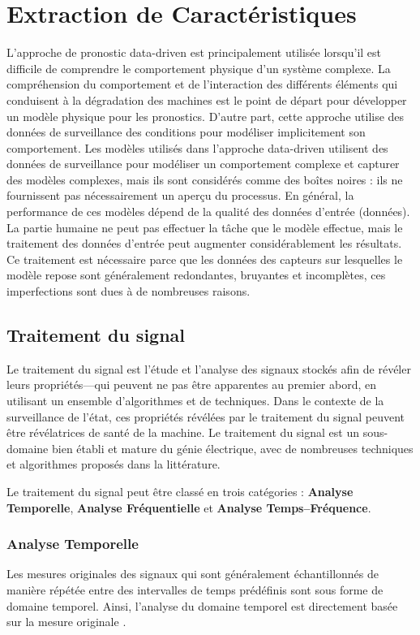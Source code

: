 \section{Extraction de Caractéristiques}
L'approche de pronostic data-driven est principalement utilisée lorsqu'il est difficile de comprendre le comportement physique d'un système complexe. La compréhension du comportement et de l'interaction des différents éléments qui conduisent à la dégradation des machines est le point de départ pour développer un modèle physique pour les pronostics.
D'autre part, cette approche utilise des données de surveillance des conditions pour modéliser implicitement son comportement. Les modèles utilisés dans l'approche data-driven utilisent des données de surveillance pour modéliser un comportement complexe et capturer des modèles complexes, mais ils sont considérés comme des boîtes noires : ils ne fournissent pas nécessairement un aperçu du processus.
En général, la performance de ces modèles dépend de la qualité des données d'entrée (données). La partie humaine ne peut pas effectuer la tâche que le modèle effectue, mais le traitement des données d'entrée peut augmenter considérablement les résultats. Ce traitement est nécessaire parce que les données des capteurs sur lesquelles le modèle repose sont généralement redondantes, bruyantes et incomplètes, ces imperfections sont dues à de nombreuses raisons.


\subsection{Traitement du signal}
Le traitement du signal est l'étude et l'analyse des signaux stockés afin de révéler leurs propriétés—qui peuvent ne pas être apparentes au premier abord, en utilisant un ensemble d'algorithmes et de techniques. Dans le contexte de la surveillance de l'état, ces propriétés révélées par le traitement du signal peuvent être révélatrices de santé de la machine.
Le traitement du signal est un sous-domaine bien établi et mature du génie électrique, avec de nombreuses techniques et algorithmes proposés dans la littérature.


Le traitement du signal peut être classé en trois catégories : \textbf{Analyse Temporelle}, \textbf{Analyse Fréquentielle} et \textbf{Analyse Temps–Fréquence}.

\subsubsection{Analyse Temporelle}
Les mesures originales des signaux qui sont généralement échantillonnés de manière répétée entre des intervalles de temps prédéfinis sont sous forme de domaine temporel. Ainsi, l'analyse du domaine temporel est directement basée sur la mesure originale \cite{Lei2016}.


